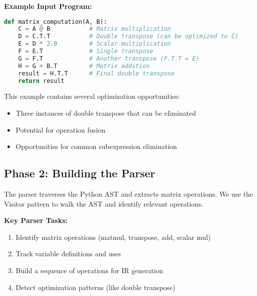 \documentclass[11pt,a4paper]{article}
\begin{document}
\textbf{Example Input Program:}
\begin{lstlisting}[language=Python, caption=Example matrix operations with optimization opportunities]
def matrix_computation(A, B):
    C = A @ B           # Matrix multiplication
    D = C.T.T           # Double transpose (can be optimized to C)
    E = D * 2.0         # Scalar multiplication
    F = E.T             # Single transpose
    G = F.T             # Another transpose (F.T.T = E)
    H = G + B.T         # Matrix addition
    result = H.T.T      # Final double transpose
    return result
\end{lstlisting}

This example contains several optimization opportunities:
\begin{itemize}
    \item Three instances of double transpose that can be eliminated
    \item Potential for operation fusion
    \item Opportunities for common subexpression elimination
\end{itemize}

\subsection{Phase 2: Building the Parser}

The parser traverses the Python AST and extracts matrix operations. We use the Visitor pattern to walk the AST and identify relevant operations.

\textbf{Key Parser Tasks:}
\begin{enumerate}
    \item Identify matrix operations (matmul, transpose, add, scalar mul)
    \item Track variable definitions and uses
    \item Build a sequence of operations for IR generation
    \item Detect optimization patterns (like double transpose)
\end{enumerate}
\end{document}
